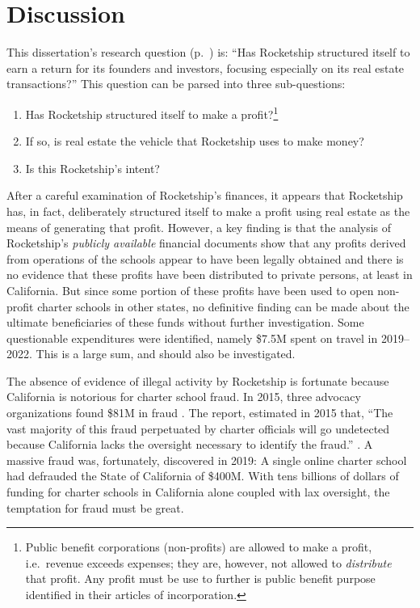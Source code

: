 
\chapter{Discussion}\label{ch:discussion}\indent%
This dissertation's research question (p.~\pageref{sec:research-question}) is: ``Has Rocketship structured itself to earn a return for its founders and investors, focusing especially on its real estate transactions?'' This question can be parsed into three sub-questions:
\begin{enumerate}
  \item Has Rocketship structured itself to make a profit?\footnote{Public benefit corporations (non-profits) are allowed to make a profit, i.e.\ revenue exceeds expenses; they are, however, not allowed to \textit{distribute} that profit. Any profit must be use to further is public benefit purpose identified in their articles of incorporation.}
  \item If so, is real estate the vehicle that Rocketship uses to make money?
  \item Is this Rocketship's intent?
\end{enumerate}

%
After a careful examination of Rocketship's finances, it appears that Rocketship has, in fact, deliberately structured itself to make a profit using real estate as the means of generating that profit. However, a key finding is that the analysis of Rocketship's \textit{publicly available} financial documents show that any profits derived from operations of the schools appear to have been legally obtained and there is no evidence that these profits have been distributed to private persons, at least in California. But since some portion of these profits have been used to open non-profit charter schools in other states, no definitive finding can be made about the ultimate beneficiaries of these funds without further investigation. Some questionable expenditures were identified, namely \$7.5M spent on travel in 2019–2022. This is a large sum, and should also be investigated.%

The absence of evidence of illegal activity by Rocketship is fortunate because California is notorious for charter school fraud. In 2015, three advocacy organizations found \$81M in fraud \citeauthor{CPD2015.etal}. The report,  estimated in 2015 that, ``The vast majority of this fraud perpetuated by charter officials will go undetected because California lacks the oversight necessary to identify the fraud.'' \parencite[2]{CPD2015.etal}. A massive fraud was, fortunately, discovered in 2019: A single online charter school had defrauded the State of California of \$400M. With tens billions of dollars of funding for charter schools in California alone coupled with lax oversight, the temptation for fraud must be great. 

